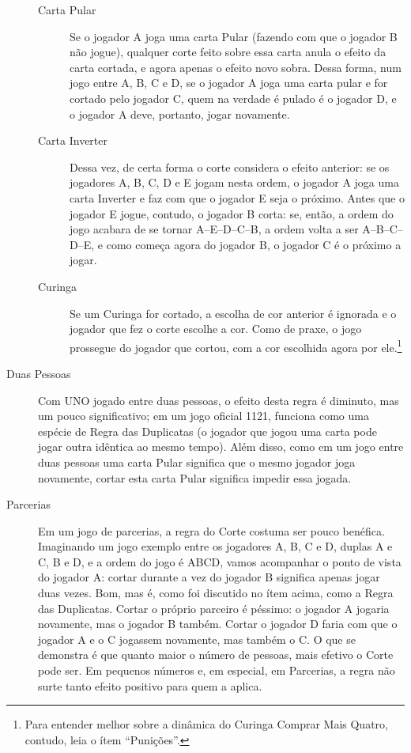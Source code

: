 \begin{description}
{\begin{description}
\item[Carta Pular]{Se o jogador A joga uma carta Pular (fazendo com que o jogador B não jogue), qualquer corte feito sobre essa carta anula o efeito da carta cortada, e agora apenas o efeito novo sobra. Dessa forma, num jogo entre A, B, C e D, se o jogador A joga uma carta pular e for cortado pelo jogador C, quem na verdade é pulado é o jogador D, e o jogador A deve, portanto, jogar novamente.}
\item[Carta Inverter]{Dessa vez, de certa forma o corte considera o efeito anterior: se os jogadores A, B, C, D e E jogam nesta ordem, o jogador A joga uma carta Inverter e faz com que o jogador E seja o próximo. Antes que o jogador E jogue, contudo, o jogador B corta: se, então, a ordem do jogo acabara de se tornar A--E--D--C--B, a ordem volta a ser A--B--C--D--E, e como começa agora do jogador B, o jogador C é o próximo a jogar.}
\item[Curinga]{Se um Curinga for cortado, a escolha de cor anterior é ignorada e o jogador que fez o corte escolhe a cor. Como de praxe, o jogo prossegue do jogador que cortou, com a cor escolhida agora por ele.\footnote{Para entender melhor sobre a dinâmica do Curinga Comprar Mais Quatro, contudo, leia o ítem ``Punições''.}}
\end{description}
}
\item[Duas Pessoas]{Com UNO jogado entre duas pessoas, o efeito desta regra é diminuto, mas um pouco significativo; em um jogo oficial 1121, funciona como uma espécie de Regra das Duplicatas (o jogador que jogou uma carta pode jogar outra idêntica ao mesmo tempo). Além disso, como em um jogo entre duas pessoas uma carta Pular significa que o mesmo jogador joga novamente, cortar esta carta Pular significa impedir essa jogada.}
\item[Parcerias]{Em um jogo de parcerias, a regra do Corte costuma ser pouco benéfica. Imaginando um jogo exemplo entre os jogadores A, B, C e D, duplas A e C, B e D, e a ordem do jogo é ABCD, vamos acompanhar o ponto de vista do jogador A: cortar durante a vez do jogador B significa apenas jogar duas vezes. Bom, mas é, como foi discutido no ítem acima, como a Regra das Duplicatas. Cortar o próprio parceiro é péssimo: o jogador A jogaria novamente, mas o jogador B também. Cortar o jogador D faria com que o jogador A e o C jogassem novamente, mas também o C. O que se demonstra é que quanto maior o número de pessoas, mais efetivo o Corte pode ser. Em pequenos números e, em especial, em Parcerias, a regra não surte tanto efeito positivo para quem a aplica.}

\end{description}
